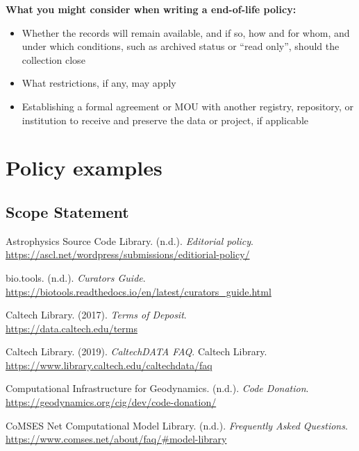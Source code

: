 \documentclass[11pt]{article}
\begin{document}
\textbf{What you might consider when writing a end-of-life policy:}

\begin{itemize}
\item Whether the records will remain available, and if so, how and for whom, and under which conditions, such as archived status or ``read only'', should the collection close

\item What restrictions, if any, may apply

\item Establishing a formal agreement or MOU with another registry, repository, or institution to receive and preserve the data or project, if applicable

\end{itemize}


\section{Policy examples}
\label{policy-examples}

\vspace*{-3pt}
\subsection{Scope Statement}
\label{scope-statement}

Astrophysics Source Code Library. (n.d.). \emph{Editorial policy}.\\
\url{https://ascl.net/wordpress/submissions/editiorial-policy/}

bio.tools. (n.d.). \emph{Curators Guide}.\\
\url{https://biotools.readthedocs.io/en/latest/curators\_guide.html}

Caltech Library. (2017). \emph{Terms of Deposit}.\\
\url{https://data.caltech.edu/terms}

Caltech Library. (2019). \emph{CaltechDATA FAQ}. Caltech Library.\\
\url{https://www.library.caltech.edu/caltechdata/faq}

Computational Infrastructure for Geodynamics. (n.d.). \emph{Code Donation}.\\
\url{https://geodynamics.org/cig/dev/code-donation/}

CoMSES Net Computational Model Library. (n.d.). \emph{Frequently Asked Questions}.\\
\url{https://www.comses.net/about/faq/\#model-library}
\end{document}
